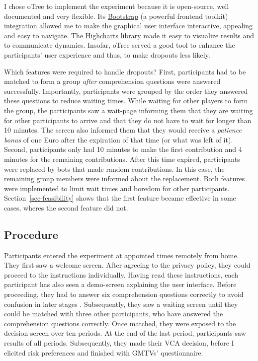 \documentclass[
  authoryear,
  review,
  3p,
  onecolumn]{elsarticle}
\begin{document}
I chose oTree \citep{oTree} to implement the experiment because it is
open-source, well documented and very flexible. Its
\href{https://getbootstrap.com/}{Bootstrap} (a powerful frontend
toolkit) integration allowed me to make the graphical user interface
interactive, appealing and easy to navigate. The
\href{https://www.highcharts.com/}{Highcharts library} made it easy to
visualize results and to communicate dynamics. Insofar, oTree served a
good tool to enhance the participants' user experience and thus, to make
dropouts less likely.

Which features were required to handle dropouts? First, participants had
to be matched to form a group \emph{after} comprehension questions were
answered successfully. Importantly, participants were grouped by the
order they answered these questions to reduce waiting times. While
waiting for other players to form the group, the participants saw a
wait-page informing them that they are waiting for other participants to
arrive and that they do not have to wait for longer than 10 minutes. The
screen also informed them that they would receive a \emph{patience
bonus} of one Euro after the expiration of that time (or what was left
of it). Second, participants only had 10 minutes to make the first
contribution and 4 minutes for the remaining contributions. After this
time expired, participants were replaced by bots that made random
contributions. In this case, the remaining group members were informed
about the replacement. Both features were implemented to limit wait
times and boredom for other participants. Section~\ref{sec-feasibility}
shows that the first feature became effective in some cases, wheres the
second feature did not.

\hypertarget{sec-procedure}{%
\subsection{Procedure}\label{sec-procedure}}

Participants entered the experiment at appointed times remotely from
home. They first saw a welcome screen. After agreeing to the privacy
policy, they could proceed to the instructions individually. Having read
these instructions, each participant has also seen a demo-screen
explaining the user interface. Before proceeding, they had to answer six
comprehension questions correctly to avoid confusion in later stages
\citep{FerraroVossler2010}. Subsequently, they saw a waiting screen
until they could be matched with three other participants, who have
answered the comprehension questions correctly. Once matched, they were
exposed to the decision screen over ten periods. At the end of the last
period, participants saw results of all periods. Subsequently, they made
their VCA decision, before I elicited risk preferences
\citep{HoltLaury2002} and finished with GMTVs' questionnaire.
\end{document}

